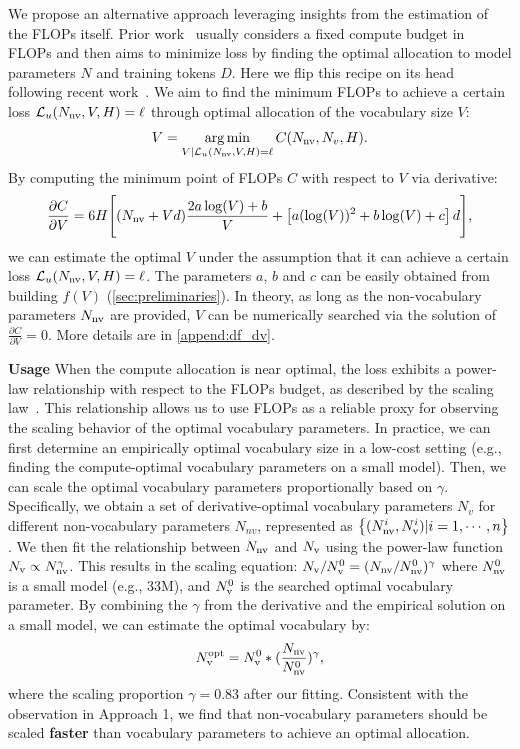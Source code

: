 We propose an alternative approach leveraging insights from the estimation of the FLOPs itself. Prior work~\citep{hoffmann2022training,kaplan2020scaling} usually considers a fixed compute budget in FLOPs and then aims to minimize loss by finding the optimal allocation to model parameters $N$ and training tokens $D$. Here we flip this recipe on its head following recent work~\citep{sardana2023beyond}. We aim to find the minimum FLOPs to achieve a certain loss $\mathcal{L}_u(N_{\rm nv}, V, H)=\ell$ through optimal allocation of the vocabulary size $V$:
\begin{equation}
    V=\mathop{\arg \min}_{V | \mathcal{L}_u(N_{\rm nv},V,H)=\ell} C(N_{\rm nv}, N_v, H).
\end{equation}
By computing the minimum point of FLOPs $C$ with respect to $V$ via derivative:
\begin{equation}
\label{eq:df_dv}
\frac{\partial C}{\partial V}  = 6H \Bigg[ (N_{\rm nv} + Vd) \frac{2a \log(V) + b}{V} + \left[a (\log(V))^2 + b \log(V) + c\right]d \Bigg],
\end{equation}
we can estimate the optimal $V$ under the assumption that it can achieve a certain loss $\mathcal{L}_u(N_{\rm nv}, V, H)=\ell$.
The parameters $a$, $b$ and $c$ can be easily obtained from building $f(V)$ (\autoref{sec:preliminaries}).
In theory, as long as the non-vocabulary parameters $N_{\rm nv}$ are provided, $V$ can be numerically searched via the solution of $\frac{\partial C}{\partial V}=0$.
More details are in \autoref{append:df_dv}.

\textbf{Usage}\;\;\;\;
When the compute allocation is near optimal, the loss exhibits a power-law relationship with respect to the FLOPs budget, as described by the scaling law~\citep{kaplan2020scaling}.
This relationship allows us to use FLOPs  as a reliable proxy for observing the scaling behavior of the optimal vocabulary parameters.
In practice, we can first determine an empirically optimal vocabulary size in a low-cost setting (e.g., finding the compute-optimal vocabulary parameters on a small model). Then, we can scale the optimal vocabulary parameters proportionally based on $\gamma$.
Specifically, we obtain a set of derivative-optimal vocabulary parameters $N_v$ for different non-vocabulary parameters $N_{nv}$, represented as $\left\{(N_{\rm nv}^i, N_{\rm v}^i)| i=1,\cdots,n \right\}$. We then fit the relationship between $N_{\rm nv}$ and $N_{\rm v}$ using the power-law function $N_{\rm v} \propto N_{\rm nv}^\gamma$. This results in the scaling equation:
$N_{\rm v}/N_{\rm v}^0 = (N_{\rm nv}/N_{\rm nv}^0)^\gamma$
where $N_{\rm nv}^0$ is a small model (e.g., 33M), and $N_{\rm v}^0$ is the searched optimal vocabulary parameter.
By combining the $\gamma$  from the derivative and the empirical solution on a small model, we can estimate the optimal vocabulary by:
\begin{align*}
\label{eq:derivative-predict}
N_{\rm v}^{\rm opt}=N_{\rm v}^0*(\frac{N_{\rm nv}}{N_{\rm nv}^0})^\gamma,
\end{align*}
where the scaling proportion $\gamma=0.83$ after our fitting. Consistent with the observation in Approach 1, we find that non-vocabulary parameters should be scaled \textbf{faster} than vocabulary parameters to achieve an optimal allocation.


